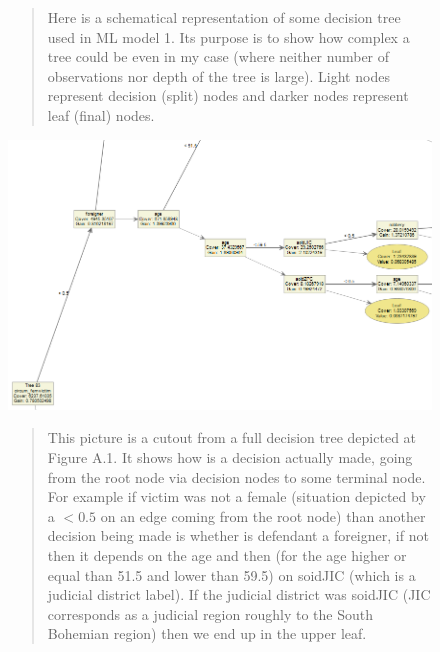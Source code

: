\documentclass[12pt, twoside,openany]{book} %
\begin{document}
\begin{appendices}
\begin{figure}[ht]
{\begin{quotation}
Here is a schematical representation of some decision tree used in ML model 1. Its purpose is to show how complex a tree could be even in my case (where neither number of observations nor depth of the tree is large). Light nodes represent decision (split) nodes and darker nodes represent leaf (final) nodes. 

\end{quotation}
}
\end{figure}

\begin{figure}[ht]
\small{

\includegraphics[width=\textwidth, height=\dimexpr
  \textheight-4\baselineskip-\parskip-.2em-
  \abovecaptionskip-\belowcaptionskip\relax]{ml1_dtree_part_renamed.png}

\begin{quotation}
This picture is a cutout from a full decision tree depicted at Figure A.1. It shows how is a decision actually made, going from the root node via decision nodes to some terminal node. For example if victim was not a female (situation depicted by a $< 0.5$ on an edge coming from the root node) than another decision being made is whether is defendant a foreigner, if not then it depends on the age and then (for the age higher or equal than 51.5 and lower than 59.5) on soidJIC (which is a judicial district label). If the judicial district was soidJIC (JIC corresponds as a judicial region roughly to the South Bohemian region) then we end up in the upper leaf.

\end{quotation}
}
\end{figure}




\end{appendices}
\end{document}
